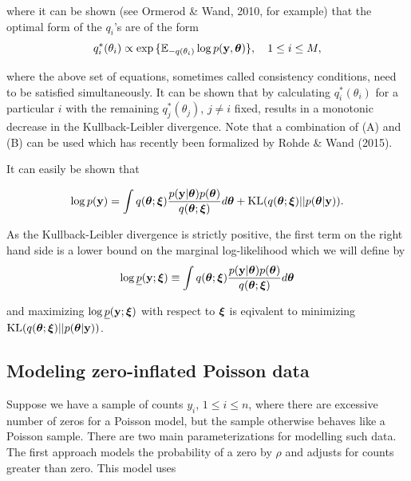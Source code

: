 \documentclass[times, doublespace]{anzsauth}
\begin{document}
\noindent where it can be shown (see Ormerod \& Wand, 2010, for example) that the optimal form of the
$q_i$'s are of the form
\begin{equation}\label{eq:consistency}
	q_i^*(\theta_i) \propto \exp{\{ {\mathbb E}_{-q(\theta_i)} \log p({\bf y}, {\boldsymbol\theta}) \}},  \quad 1\le i\le M,
\end{equation}

\noindent where the above set of equations, sometimes called consistency conditions, need to be 
satisfied simultaneously. It can be shown that by calculating $q_i^*(\theta_i)$ for a particular
$i$ with the remaining $q_j^*(\theta_j)$, $j\ne i$ fixed, results in a monotonic decrease in the 
Kullback-Leibler divergence. Note that a combination of (A) and (B) can be used which has recently
been formalized by Rohde \& Wand (2015). 

\noindent It can easily be shown that

$$
\displaystyle \log p({\bf y}) = \int q({\boldsymbol \theta};{\boldsymbol \xi})\frac{p({\bf y}|{\boldsymbol \theta})p({\boldsymbol \theta})}{q({\boldsymbol \theta};{\boldsymbol \xi})} d{\boldsymbol \theta} + \text{KL}(q({\boldsymbol \theta};{\boldsymbol \xi})||p({\boldsymbol \theta}|{\bf y})).
$$

\noindent As the Kullback-Leibler divergence is strictly positive, the first term on the right hand side
is a lower bound on the marginal log-likelihood which we will define by
$$
\displaystyle \log \underline{p}({\bf y};{\boldsymbol \xi}) \equiv \int q({\boldsymbol \theta};{\boldsymbol \xi})\frac{p({\bf y}|{\boldsymbol \theta})p({\boldsymbol \theta})}{q({\boldsymbol \theta};{\boldsymbol \xi})} d{\boldsymbol \theta}
$$

\noindent and maximizing $\log \underline{p}({\bf y};{\boldsymbol \xi})$ with respect to ${\boldsymbol \xi}$ is eqivalent to minimizing
$\text{KL}(q({\boldsymbol \theta};{\boldsymbol \xi})||p({\boldsymbol \theta}|{\bf y}))$.


\subsection{Modeling zero-inflated Poisson data}

Suppose we have a sample of counts $y_i$, $1\le i\le n$, where there are excessive number of zeros  for a
Poisson model, but the sample otherwise behaves like a Poisson sample. There are two main  parameterizations
for modelling such data. The first approach models the probability of a zero by $\rho$ and adjusts for counts
greater than zero. This model uses
\end{document}
